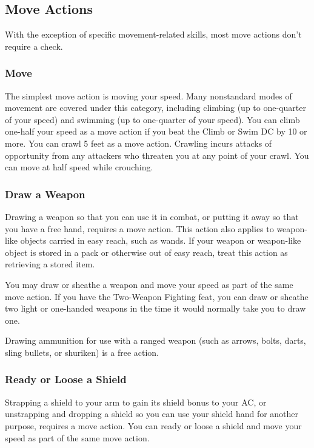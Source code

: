 \subsection{Move Actions}
With the exception of specific movement-related skills, most move actions don't require a check.

\subsubsection{Move}
The simplest move action is moving your speed. Many nonstandard modes of movement are covered under this category, including climbing (up to one-quarter of your speed) and swimming (up to one-quarter of your speed).
 You can climb one-half your speed as a move action if you beat the Climb or Swim DC by 10 or more.
 You can crawl 5 feet as a move action. Crawling incurs attacks of opportunity from any attackers who threaten you at any point of your crawl.
 You can move at half speed while crouching.

\subsubsection{Draw a Weapon}
Drawing a weapon so that you can use it in combat, or putting it away so that you have a free hand, requires a move action. This action also applies to weapon-like objects carried in easy reach, such as wands. If your weapon or weapon-like object is stored in a pack or otherwise out of easy reach, treat this action as retrieving a stored item.

You may draw or sheathe a weapon and move your speed as part of the same move action. If you have the Two-Weapon Fighting feat, you can draw or sheathe two light or one-handed weapons in the time it would normally take you to draw one.

Drawing ammunition for use with a ranged weapon (such as arrows, bolts, darts, sling bullets, or shuriken) is a free action.

\subsubsection{Ready or Loose a Shield}
Strapping a shield to your arm to gain its shield bonus to your AC, or unstrapping and dropping a shield so you can use your shield hand for another purpose, requires a move action. You can ready or loose a shield and move your speed as part of the same move action.

